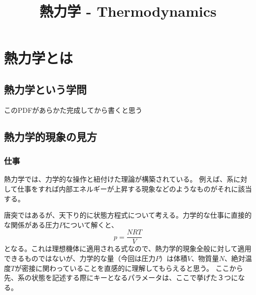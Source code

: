 \documentclass[a4paper]{jsreport}
\title{熱力学 - Thermodynamics}
\begin{document}
    \maketitle

    \tableofcontents

    \chapter{熱力学とは}
        \section{熱力学という学問}
        このPDFがあらかた完成してから書くと思う
            
        \section{熱力学的現象の見方}

            \subsection*{仕事}
                熱力学では、力学的な操作と紐付けた理論が構築されている。
                例えば、系に対して仕事をすれば内部エネルギーが上昇する現象などのようなものがそれに該当する。\par
                唐突ではあるが、天下り的に状態方程式について考える。力学的な仕事に直接的な関係がある圧力$P$について解くと、
                \begin{equation}
                    p = \frac{NRT}{V}
                \end{equation}
                となる。これは理想機体に適用される式なので、熱力学的現象全般に対して適用できるものではないが、力学的な量（今回は圧力$P$）は体積$V$、物質量$N$、絶対温度$T$が密接に関わっていることを直感的に理解してもらえると思う。
                ここから先、系の状態を記述する際にキーとなるパラメータは、ここで挙げた３つになる。
\end{document}

